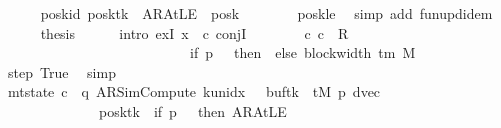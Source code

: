 \begin{isabellebody}
\ \ \ \ \isamarkupfalse%
\ poskid{\isacharcolon}{\kern0pt}\ {\isachardoublequoteopen}posk{\isacharparenleft}{\kern0pt}tk\ {\isacharcolon}{\kern0pt}{\isacharequal}{\kern0pt}\ AR{\isacharunderscore}{\kern0pt}AtLE{\isacharparenright}{\kern0pt}\ {\isacharequal}{\kern0pt}\ posk{\isachardoublequoteclose}\isanewline
\ \ \ \ \ \ \isamarkupfalse%
\ posk{\isacharunderscore}{\kern0pt}le\ \isamarkupfalse%
\ {\isacharparenleft}{\kern0pt}simp\ add{\isacharcolon}{\kern0pt}\ fun{\isacharunderscore}{\kern0pt}upd{\isacharunderscore}{\kern0pt}idem{\isacharparenright}{\kern0pt}\isanewline
\ \ \ \ \isamarkupfalse%
\ {\isacharquery}{\kern0pt}thesis\isanewline
\ \ \ \ \isamarkupfalse%
\ {\isacharparenleft}{\kern0pt}intro\ exI{\isacharbrackleft}{\kern0pt}\ x\ {\isacharequal}{\kern0pt}\ c{\isacharprime}{\kern0pt}{\isacharprime}{\kern0pt}{\isacharbrackright}{\kern0pt}\ conjI{\isacharparenright}{\kern0pt}\isanewline
\ \ \ \ \ \ \isamarkupfalse%
\ {\isachardoublequoteopen}{\isacharparenleft}{\kern0pt}c{\isacharprime}{\kern0pt}{\isacharcomma}{\kern0pt}\ c{\isacharprime}{\kern0pt}{\isacharprime}{\kern0pt}{\isacharparenright}{\kern0pt}\ {\isasymin}\ R{\isacharprime}{\kern0pt}\isanewline
\ \ \ \ \ \ \ \ \ \ \ \ \ \ \ \ \ \ \ \ \ \ \ \ \ \ {\isacharcircum}{\kern0pt}{\isacharcircum}{\kern0pt}\ {\isacharparenleft}{\kern0pt}if\ p\ {\isacharequal}{\kern0pt}\ {}\ then\ {}\ else\ block{\isacharunderscore}{\kern0pt}width\ {\isacharparenleft}{\kern0pt}{\isasymGamma}{\isacharunderscore}{\kern0pt}tm\ M{\isacharparenright}{\kern0pt}\ {\isacharplus}{\kern0pt}\ {}{\isacharparenright}{\kern0pt}{\isachardoublequoteclose}\isanewline
\ \ \ \ \ \ \ \ \isamarkupfalse%
\ step\ True\ \isamarkupfalse%
\ simp\isanewline
\ \ \ \ \ \ \isamarkupfalse%
\ {\isachardoublequoteopen}mt{\isacharunderscore}{\kern0pt}state\ c{\isacharprime}{\kern0pt}{\isacharprime}{\kern0pt}\ {\isacharequal}{\kern0pt}\ {\isacharparenleft}{\kern0pt}q{\isacharcomma}{\kern0pt}\ AR{\isacharunderscore}{\kern0pt}SimCompute{\isacharcomma}{\kern0pt}\ k{\isacharunderscore}{\kern0pt}unidx\ {}{\isacharcomma}{\kern0pt}\ {}{\isacharcomma}{\kern0pt}\ buf{\isacharparenleft}{\kern0pt}tk\ {\isacharcolon}{\kern0pt}{\isacharequal}{\kern0pt}\ tM\ p{\isacharparenright}{\kern0pt}{\isacharcomma}{\kern0pt}\ dvec{\isacharcomma}{\kern0pt}\isanewline
\ \ \ \ \ \ \ \ \ \ \ \ \ \ posk{\isacharparenleft}{\kern0pt}tk\ {\isacharcolon}{\kern0pt}{\isacharequal}{\kern0pt}\ if\ p\ {\isacharequal}{\kern0pt}\ {}\ then\ AR{\isacharunderscore}{\kern0pt}AtLE\isanewline

\end{isabellebody}

